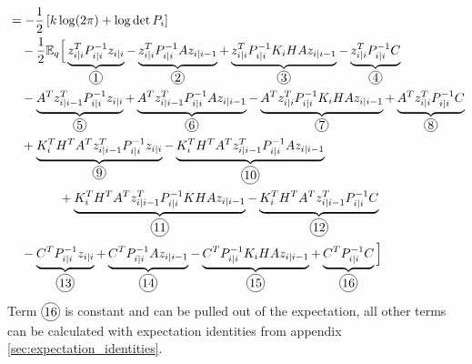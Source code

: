 \documentclass[12pt]{article}
\newcommand*\circled[1]{\tikz[baseline=(char.base)]{
    \node[shape=circle,draw,inner sep=0.8pt] (char) {#1};}}
\begin{document}
\begin{align}
    &= -\frac{1}{2} \left[ k \log (2\pi) + \log \det P_i \right] \nonumber \\
    &\quad - \frac{1}{2} \E_q \Big[ \underbrace{z_{i|i}^TP^{-1}_{i|i}z_{i|i}}_{\circled{1}} - \underbrace{z_{i|i}^TP^{-1}_{i|i}Az_{i|i-1}}_{\circled{2}} + \underbrace{z_{i|i}^TP^{-1}_{i|i}K_iHAz_{i|i-1}}_{\circled{3}} - \underbrace{z_{i|i}^TP^{-1}_{i|i}C}_{\circled{4}} \nonumber \\
    &\quad - \underbrace{A^Tz^T_{i|i-1}P^{-1}_{i|i}z_{i|i}}_{\circled{5}} + \underbrace{A^Tz^T_{i|i-1}P^{-1}_{i|i}Az_{i|i-1}}_{\circled{6}} - \underbrace{A^Tz^T_{i|i}P^{-1}_{i|i}K_iHAz_{i|i-1}}_{\circled{7}} + \underbrace{A^Tz^T_{i|i}P^{-1}_{i|i}C}_{\circled{8}} \nonumber \\
    &\quad + \underbrace{K_i^TH^TA^Tz^T_{i|i-1}P^{-1}_{i|i}z_{i|i}}_{\circled{9}} - \underbrace{K_i^TH^TA^Tz^T_{i|i-1}P^{-1}_{i|i}Az_{i|i-1}}_{\circled{10}} \nonumber \\
    &\qquad \qquad + \underbrace{K_i^TH^TA^Tz^T_{i|i-1}P^{-1}_{i|i}KHAz_{i|i-1}}_{\circled{11}} - \underbrace{K_i^TH^TA^Tz^T_{i|i-1}P^{-1}_{i|i}C}_{\circled{12}} \nonumber \\
    &\quad - \underbrace{C^TP^{-1}_{i|i}z_{i|i}}_{\circled{13}} + \underbrace{C^TP^{-1}_{i|i}Az_{i|i-1}}_{\circled{14}} - \underbrace{C^TP^{-1}_{i|i}K_iHAz_{i|i-1}}_{\circled{15}} + \underbrace{C^TP^{-1}_{i|i}C}_{\circled{16}} \Big]
\end{align}
Term $\circled{16}$ is constant and can be pulled out of the expectation,
all other terms can be calculated with expectation identities from appendix \ref{sec:expectation_identities}.
\end{document}
